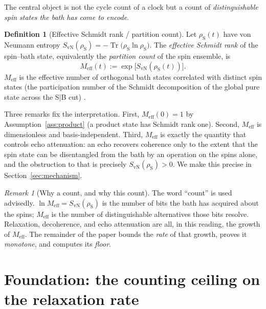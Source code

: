 \documentclass[twocolumn,10pt,a4paper]{article}
\theoremstyle{thmstyle}
\theoremstyle{definition}
\newtheorem{definition}[theorem]{Definition}
\theoremstyle{remark}
\newtheorem{remark}[theorem]{Remark}
\newcommand{\Tr}{\operatorname{Tr}}
\newcommand{\sysrho}{\rho_{\mathrm{S}}}
\newcommand{\Svn}{S_{\mathrm{vN}}}
\newcommand{\Meff}{M_{\mathrm{eff}}}
\begin{document}
The central object is not the cycle count of a clock but a count of
\emph{distinguishable spin states the bath has come to encode}.

\begin{definition}[Effective Schmidt rank / partition count]
\label{def:count}
Let $\sysrho(t)$ have von Neumann entropy
$\Svn(\sysrho)=-\Tr\!\bigl(\sysrho\ln\sysrho\bigr)$. The
\emph{effective Schmidt rank} of the spin--bath state, equivalently the
\emph{partition count} of the spin ensemble, is
\begin{equation}
\Meff(t) := \exp\!\bigl[\Svn(\sysrho(t))\bigr].
\label{eq:Meff}
\end{equation}
$\Meff$ is the effective number of orthogonal bath states correlated with
distinct spin states (the participation number of the Schmidt
decomposition of the global pure state across the S$\mid$B cut)
\citep{nielsen2010}.
\end{definition}

Three remarks fix the interpretation. First, $\Meff(0)=1$ by
Assumption~\ref{ass:product} (a product state has Schmidt rank one).
Second, $\Meff$ is dimensionless and basis-independent. Third, $\Meff$ is
exactly the quantity that controls echo attenuation: an echo recovers
coherence only to the extent that the spin state can be disentangled from
the bath by an operation on the spins alone, and the obstruction to that
is precisely $\Svn(\sysrho)>0$. We make this precise in
Section~\ref{sec:mechanism}.

\begin{remark}[Why a count, and why this count]
\label{rem:why-count}
The word ``count'' is used advisedly. $\ln\Meff=\Svn(\sysrho)$ is the
number of bits the bath has acquired about the spins; $\Meff$ is the
number of distinguishable alternatives those bits resolve. Relaxation,
decoherence, and echo attenuation are all, in this reading, the growth of
$\Meff$. The remainder of the paper bounds the \emph{rate} of that
growth, proves it \emph{monotone}, and computes its \emph{floor}.
\end{remark}

\section{Foundation: the counting ceiling on the relaxation rate}
\label{sec:ceiling}
\end{document}
